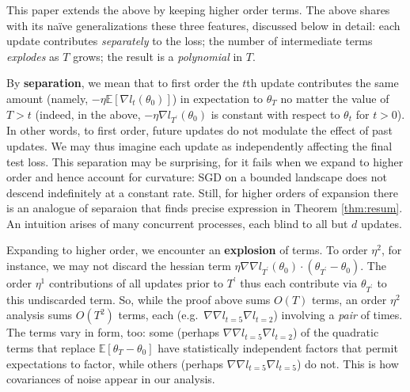 \documentclass[anon,12pt]{colt2021} %
\newcommand{\pr}{\prime}
\newcommand{\expc}{\mathbb{E}}
\begin{document}
            This paper extends the above by keeping higher order terms.  The
            above shares with its na\"ive generalizations these three features,
            discussed below in detail: each update contributes
            \emph{separately} to the loss; the number of intermediate terms
            \emph{explodes} as $T$ grows; the result is a \emph{polynomial} in
            $T$.

            By \textbf{separation}, we mean that to first order the $t$th
            update contributes the same amount (namely, $-\eta \expc[\nabla
            l_{t}(\theta_0)]$) in expectation to $\theta_T$ no matter the value
            of $T>t$ (indeed, in the above, \colorbox{moolime}{$- \eta \nabla
            l_{T^\pr}(\theta_0)$} is constant with respect to $\theta_t$ for
            $t>0$).
            In other words, to first order, future updates do not
            modulate the effect of past updates.
            We may thus imagine each update as independently affecting
            the final test loss.  
            This separation may be surprising, for it fails when we expand to
            higher order and hence account for curvature: SGD on a bounded
            landscape does not descend indefinitely at a constant rate. 
            Still, for higher orders of expansion there is an
            analogue of separaion that finds precise expression in Theorem
            \ref{thm:resum}.  An intuition arises of many
            concurrent processes, each blind to all but $d$ updates.

            Expanding to higher order, we encounter an \textbf{explosion} of
            terms.  To order $\eta^2$, for instance, we may not
            discard the hessian term \colorbox{moosky}{$\eta\nabla\nabla
            l_{T^\pr}(\theta_0) \cdot (\theta_{T^\pr} - \theta_0)$}.  The order
            $\eta^1$ contributions of all updates prior to $T^\pr$ thus each
            contribute via $\theta_{T^\pr}$ to this undiscarded term.  So,
            while the proof above sums $O(T)$ terms, an order $\eta^2$ analysis
            sums $O(T^2)$ terms, each (e.g.\ $\nabla\nabla l_{t=5} \nabla
            l_{t=2}$) involving a \emph{pair} of times.  The terms vary in
            form, too: some (perhaps $\nabla\nabla l_{t=5} \nabla l_{t=2}$) of
            the quadratic terms that replace \colorbox{moopink}{$\expc[\theta_T
            - \theta_0]$} have statistically independent factors that permit
            expectations to factor, while others (perhaps $\nabla\nabla l_{t=5}
            \nabla l_{t=5}$) do not.  This is how covariances of noise appear
            in our analysis.
\end{document}
